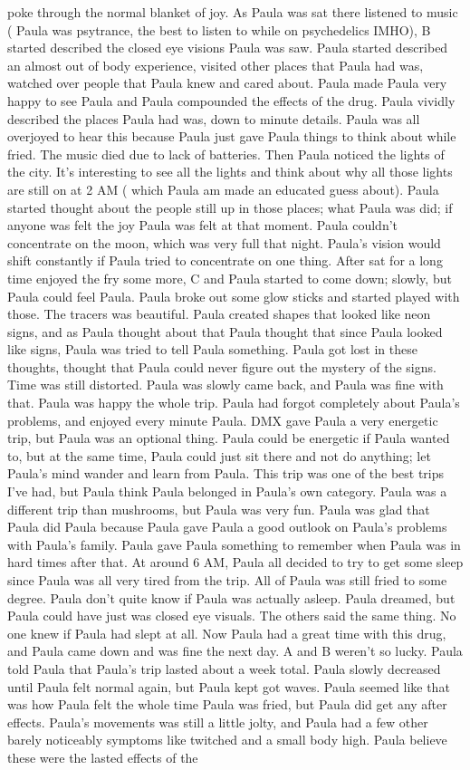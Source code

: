 \documentclass[12pt]{book}
\begin{document}
poke through the normal blanket of joy. As Paula was sat there listened to music ( Paula was psytrance, the best to listen to while on psychedelics IMHO), B started described the closed eye visions Paula was saw. Paula started described an almost out of body experience, visited other places that Paula had was, watched over people that Paula knew and cared about. Paula made Paula very happy to see Paula and Paula compounded the effects of the drug. Paula vividly described the places Paula had was, down to minute details. Paula was all overjoyed to hear this because Paula just gave Paula things to think about while fried. The music died due to lack of batteries. Then Paula noticed the lights of the city. It's interesting to see all the lights and think about why all those lights are still on at 2 AM ( which Paula am made an educated guess about). Paula started thought about the people still up in those places; what Paula was did; if anyone was felt the joy Paula was felt at that moment. Paula couldn't concentrate on the moon, which was very full that night. Paula's vision would shift constantly if Paula tried to concentrate on one thing. After sat for a long time enjoyed the fry some more, C and Paula started to come down; slowly, but Paula could feel Paula. Paula broke out some glow sticks and started played with those. The tracers was beautiful. Paula created shapes that looked like neon signs, and as Paula thought about that Paula thought that since Paula looked like signs, Paula was tried to tell Paula something. Paula got lost in these thoughts, thought that Paula could never figure out the mystery of the signs. Time was still distorted. Paula was slowly came back, and Paula was fine with that. Paula was happy the whole trip. Paula had forgot completely about Paula's problems, and enjoyed every minute Paula. DMX gave Paula a very energetic trip, but Paula was an optional thing. Paula could be energetic if Paula wanted to, but at the same time, Paula could just sit there and not do anything; let Paula's mind wander and learn from Paula. This trip was one of the best trips I've had, but Paula think Paula belonged in Paula's own category. Paula was a different trip than mushrooms, but Paula was very fun. Paula was glad that Paula did Paula because Paula gave Paula a good outlook on Paula's problems with Paula's family. Paula gave Paula something to remember when Paula was in hard times after that. At around 6 AM, Paula all decided to try to get some sleep since Paula was all very tired from the trip. All of Paula was still fried to some degree. Paula don't quite know if Paula was actually asleep. Paula dreamed, but Paula could have just was closed eye visuals. The others said the same thing. No one knew if Paula had slept at all. Now Paula had a great time with this drug, and Paula came down and was fine the next day. A and B weren't so lucky. Paula told Paula that Paula's trip lasted about a week total. Paula slowly decreased until Paula felt normal again, but Paula kept got waves. Paula seemed like that was how Paula felt the whole time Paula was fried, but Paula did get any after effects. Paula's movements was still a little jolty, and Paula had a few other barely noticeably symptoms like twitched and a small body high. Paula believe these were the lasted effects of the 
\end{document}
